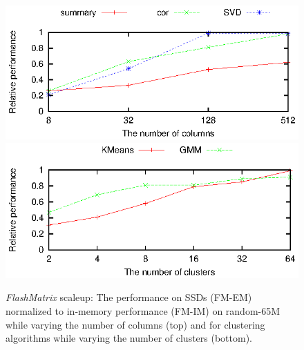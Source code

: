 \begin{figure}[t]
	\begin{center}
		\footnotesize
		\includegraphics{FlashMatrix_figs/IM-vs-EM-stat.eps}
		\includegraphics{FlashMatrix_figs/IM-vs-EM-clust.eps}
		\caption{{\em FlashMatrix} scaleup: The performance on SSDs  (FM-EM)
      normalized to in-memory performance (FM-IM) on random-65M 
      while varying the number of columns (top) and for
clustering algorithms while varying the number of clusters (bottom).}
		\label{perf:stat}
	\end{center}
  \vspace{-15pt}
\end{figure}

